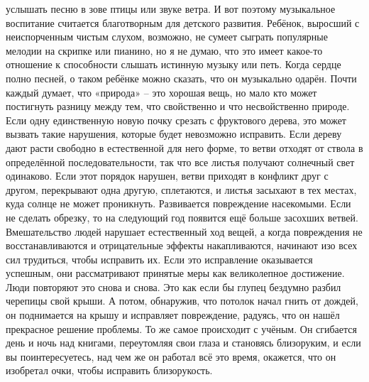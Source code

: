 \documentclass[a4paper]{book}
\begin{document}
услышать песню в зове птицы или звуке ветра. И вот поэтому музыкальное воспитание
считается благотворным для детского развития.
Ребёнок, выросший с неиспорченным чистым слухом, возможно, не сумеет сыграть
популярные мелодии на скрипке или пианино, но я не думаю, что это имеет какое-то
отношение к способности слышать истинную музыку или петь. Когда сердце полно песней,
о таком ребёнке можно сказать, что он музыкально одарён.
Почти каждый думает, что «природа» – это хорошая вещь, но мало кто может постигнуть
разницу между тем, что свойственно и что несвойственно природе.
Если одну единственную новую почку срезать с фруктового дерева, это может вызвать
такие нарушения, которые будет невозможно исправить. Если дереву дают расти свободно в
естественной для него форме, то ветви отходят от ствола в определённой
последовательности, так что все листья получают солнечный свет одинаково. Если этот
порядок нарушен, ветви приходят в конфликт друг с другом, перекрывают одна другую,
сплетаются, и листья засыхают в тех местах, куда солнце не может проникнуть. Развивается
повреждение насекомыми. Если не сделать обрезку, то на следующий год появится ещё
больше засохших ветвей.
Вмешательство людей нарушает естественный ход вещей, а когда повреждения не
восстанавливаются и отрицательные эффекты накапливаются, начинают изо всех сил
трудиться, чтобы исправить их. Если это исправление оказывается успешным, они
рассматривают принятые меры как великолепное достижение. Люди повторяют это снова и
снова. Это как если бы глупец бездумно разбил черепицы свой крыши. А потом, обнаружив,
что потолок начал гнить от дождей, он поднимается на крышу и исправляет повреждение,
радуясь, что он нашёл прекрасное решение проблемы.
То же самое происходит с учёным. Он сгибается день и ночь над книгами, переутомляя
свои глаза и становясь близоруким, и если вы поинтересуетесь, над чем же он работал всё
это время, окажется, что он изобретал очки, чтобы исправить близорукость.
\end{document}
